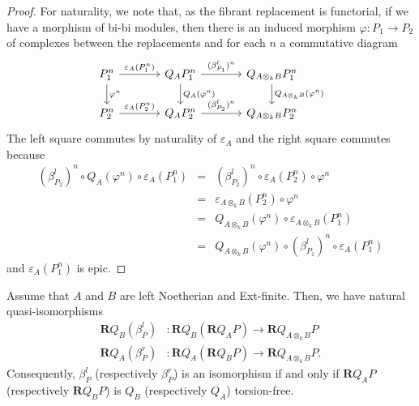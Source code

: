 \begin{proof}
  For naturality, we note that, as the fibrant replacement is functorial, if we have a morphism of bi-bi modules, then there is an induced morphism \(\varphi \colon P_1 \to P_2\) of complexes between the replacements and for each \(n\) a commutative diagram 
  \[\begin{tikzcd}[column sep=large]
  P_1^n \arrow{d}{\varphi^n}\arrow{r}{\varepsilon_{A}(P_1^n)} & Q_{A} P_1^n\arrow{d}{Q_{A}(\varphi^n)} \arrow{r}{(\beta^l_{P_1})^n} & Q_{A \otimes_k B}P_1^n \arrow{d}{Q_{A \otimes_k B}(\varphi^n)}\\
  P_2^n \arrow{r}{\varepsilon_{A}(P_2^n)} & Q_{A} P_2^n \arrow{r}{(\beta^l_{P_2})^n} & Q_{A \otimes_k B} P_2^n
  \end{tikzcd}\]  The left square commutes by naturality of \(\varepsilon_{A}\) and the right square commutes because
  \begin{eqnarray*}
    (\beta^l_{P_2})^n \circ Q_{A}(\varphi^n) \circ \varepsilon_{A}(P_1^n)
    &=& (\beta^l_{P_2})^n \circ \varepsilon_{A}(P_2^n) \circ \varphi^n\\
    &=&  \varepsilon_{A \otimes_k B}(P_2^n) \circ \varphi^n\\
    &=& Q_{A \otimes_k B}(\varphi^n) \circ \varepsilon_{A \otimes_k B}(P_1^n)\\
    &=& Q_{A \otimes_k B}(\varphi^n) \circ (\beta^l_{P_1})^n \circ \varepsilon_{A}(P_1^n)
  \end{eqnarray*}
  and \(\varepsilon_{A}(P_1^n)\) is epic.
\end{proof}

\begin{proposition} \label{proposition: bi-torsion is a composition}
  Assume that \(A\) and \(B\) are left Noetherian and Ext-finite. Then, we have natural quasi-isomorphisms 
  \begin{align*}
    \mathbf{R}Q_B(\beta^l_P) & : \mathbf{R}Q_B(\mathbf{R}Q_A P) \to \mathbf{R}Q_{A \otimes_k B} P \\
    \mathbf{R}Q_A(\beta^r_P) & : \mathbf{R}Q_A(\mathbf{R}Q_B P) \to \mathbf{R}Q_{A \otimes_k B} P.
  \end{align*}
  Consequently, \(\beta^l_P\) (respectively \(\beta^r_P\)) is an isomorphism if and only if \(\mathbf{R}Q_A P\) (respectively \(\mathbf{R}Q_B P\)) is \(Q_B\) (respectively \(Q_A\)) torsion-free.
\end{proposition}


